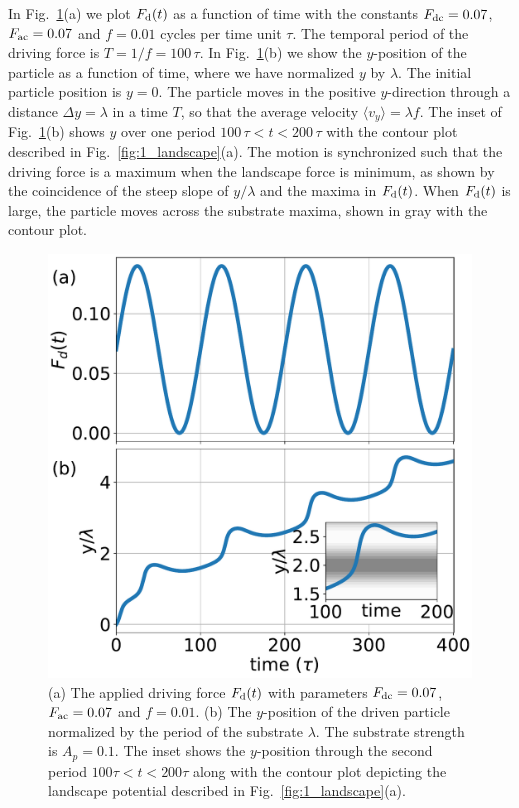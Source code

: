 \documentclass[preprint,showpacs,preprintnumbers,amsmath,amssymb,aps,prb]{revtex4-1}
\theoremstyle{remark}
\begin{document}
In Fig.~\ref{fig:2_Fd_vy_time}(a)
we plot $F_{\rm d}(t)$ 
as a function of time with the
constants $F_{\rm dc}=0.07$, 
$F_{\rm ac}=0.07$ and $f=0.01$ cycles per time unit $\tau$.
The temporal period of the driving force is
$T = 1/f = 100\,\tau$.
In Fig.~\ref{fig:2_Fd_vy_time}(b) 
we show the $y$-position of the particle
as a function of time,
where we have
normalized $y$ by $\lambda$.
The initial particle position is $y = 0$. 
The particle moves
in the positive $y$-direction
through a distance $\Delta y = \lambda$  in a time $T$,
so that  
the average velocity 
$\langle {v}_y \rangle = \lambda f$. 
The inset of Fig.~\ref{fig:2_Fd_vy_time}(b)
shows $y$ 
over one period $100\,\tau < t < 200\,\tau$
with 
the contour plot described
in Fig.~\ref{fig:1_landscape}(a).
The motion is synchronized such that the 
driving force is a maximum when the landscape 
force is minimum,
as shown by the coincidence of the
steep slope of 
$y/\lambda$ 
and the maxima in $F_{\rm d}(t)$.
When $F_{\rm d}(t)$ is large,
the particle moves across the substrate maxima,
shown in gray with the contour plot.
\begin{figure}[h]
\centering
\includegraphics[width=\columnwidth]{fig2_Fd_vy_time.pdf}
\caption{(a) The applied driving force $F_{\rm d}(t)$ 
  with parameters $F_{\rm dc} = 0.07$, $F_{\rm ac} = 0.07$ and $f=0.01$.
  (b) 
  The $y$-position of the driven particle
  normalized by the period of the substrate $\lambda$.
  The substrate strength is $A_p=0.1$.
  The inset   shows
  the $y$-position
  through the second period $100\tau<t<200\tau$
 along with the contour plot depicting
  the landscape potential described in Fig.~\ref{fig:1_landscape}(a).
  }
\label{fig:2_Fd_vy_time}
\end{figure}
\end{document}

